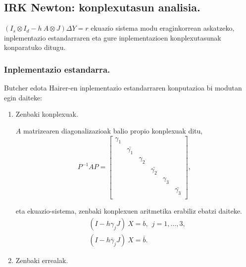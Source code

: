 \subsection{IRK Newton: konplexutasun analisia.}

$(I_s \otimes I_d - h \ A \otimes J) \Delta Y = r$ ekuazio sistema modu eraginkorrean askatzeko, inplementazio estandarraren eta gure inplementazioen konplexutasunak konparatuko ditugu.

\subsubsection*{Inplementazio estandarra.}

Butcher edota Hairer-en inplementazio estandarraren konputazioa bi modutan egin daiteke:

\begin{enumerate}
\item Zenbaki konplexuak.

$A$ matrizearen diagonalizazioak balio propio konplexuak ditu, 
\begin{equation*}
P^{-1}AP=\begin{bmatrix}
  \gamma_1 &                &          &                &           &                 \\
           & \bar{\gamma_1} &          &                &           &                 \\
           &                & \gamma_2 &                &           &                 \\
           &                &          & \bar{\gamma_2} &           &                 \\ 
           &                &          &                & \gamma_3   &                 \\
           &                &          &                &            & \bar{\gamma_3} \\  
\end{bmatrix},
\end{equation*}

eta ekuazio-sistema, zenbaki konplexuen aritmetika erabiliz ebatzi daiteke.
\begin{align*}
&(I-h \gamma_j J) \ X = b, \ \ j=1,\dots,3, \\
&(I-h \bar{\gamma}_j J) \ X = \bar{b}. 
\end{align*}

\item Zenbaki errealak.


\end{enumerate}
